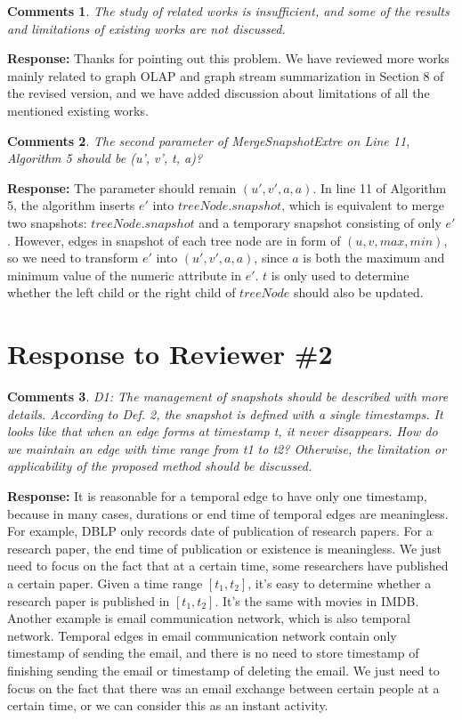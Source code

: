 \documentclass{article}
\newtheorem{Comments}{\textbf{Comments}}
\begin{document}
\begin{Comments}
The study of related works is insufficient, and some of the results and limitations of existing works are not discussed.
\end{Comments}
\noindent \textbf{Response:} Thanks for pointing out this problem. We have reviewed more works mainly related to graph OLAP and graph stream summarization in Section 8 of the revised version, and we have added discussion about limitations of all the mentioned existing works.

\begin{Comments}
The second parameter of MergeSnapshotExtre on Line 11, Algorithm 5 should be (u’, v’, t, a)?
\end{Comments}
\noindent \textbf{Response:} The parameter should remain $ (u',v',a,a) $. In line 11 of Algorithm 5, the algorithm inserts $ e' $ into $ treeNode.snapshot $, which is equivalent to merge two snapshots: $ treeNode.snapshot $ and a temporary snapshot consisting of only $ e' $. However, edges in snapshot of each tree node are in form of $ (u,v,max,min) $, so we need to transform $ e' $ into $ (u',v',a,a) $, since $ a $ is both the maximum and minimum value of the numeric attribute in $ e' $. $ t $ is only used to determine whether the left child or the right child of $ treeNode $ should also be updated.


\section{Response to Reviewer \#2}
\setcounter{Comments}{0}
\begin{Comments}
D1: The management of snapshots should be described with more details. According to Def. 2, the snapshot is defined with a single timestamps. It looks like that when an edge forms at timestamp t, it never disappears. How do we maintain an edge with time range from t1 to t2? Otherwise, the limitation or applicability of the proposed method should be discussed.
\end{Comments}
\noindent \textbf{Response:} It is reasonable for a temporal edge to have only one timestamp, because in many cases, durations or end time of temporal edges are meaningless. For example, DBLP only records date of publication of research papers. For a research paper, the end time of publication or existence is meaningless. We just need to focus on the fact that at a certain time, some researchers have published a certain paper. Given a time range $ [t_1,t_2] $, it's easy to determine whether a research paper is published in $ [t_1,t_2] $. It's the same with movies in IMDB. Another example is email communication network, which is also temporal network. Temporal edges in email communication network contain only timestamp of sending the email, and there is no need to store timestamp of finishing sending the email or timestamp of deleting the email. We just need to focus on the fact that there was an email exchange between certain people at a certain time, or we can consider this as an instant activity.
\end{document}
